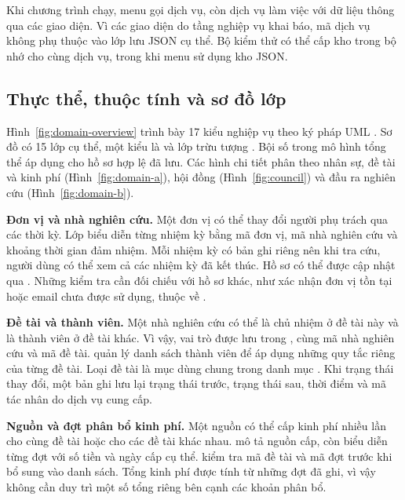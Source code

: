 Khi chương trình chạy, menu gọi dịch vụ, còn dịch vụ làm việc với dữ liệu thông qua các giao diện. Vì các giao diện do tầng nghiệp vụ khai báo, mã dịch vụ không phụ thuộc vào lớp lưu JSON cụ thể. Bộ kiểm thử có thể cấp kho trong bộ nhớ cho cùng dịch vụ, trong khi menu sử dụng kho JSON.

\subsection{Thực thể, thuộc tính và sơ đồ lớp}\label{sec:entities}

Hình~\ref{fig:domain-overview} trình bày 17 kiểu nghiệp vụ theo ký pháp UML . Sơ đồ có 15 lớp cụ thể, một kiểu  là  và lớp trừu tượng . Bội số trong mô hình tổng thể áp dụng cho hồ sơ hợp lệ đã lưu. Các hình chi tiết phân theo nhân sự, đề tài và kinh phí (Hình~\ref{fig:domain-a}), hội đồng (Hình~\ref{fig:council}) và đầu ra nghiên cứu (Hình~\ref{fig:domain-b}).

\textbf{Đơn vị và nhà nghiên cứu.} Một đơn vị có thể thay đổi người phụ trách qua các thời kỳ. Lớp  biểu diễn từng nhiệm kỳ bằng mã đơn vị, mã nhà nghiên cứu và khoảng thời gian đảm nhiệm. Mỗi nhiệm kỳ có bản ghi riêng nên khi tra cứu, người dùng có thể xem cả các nhiệm kỳ đã kết thúc. Hồ sơ  có thể được cập nhật qua . Những kiểm tra cần đối chiếu với hồ sơ khác, như xác nhận đơn vị tồn tại hoặc email chưa được sử dụng, thuộc về .

\textbf{Đề tài và thành viên.} Một nhà nghiên cứu có thể là chủ nhiệm ở đề tài này và là thành viên ở đề tài khác. Vì vậy, vai trò được lưu trong , cùng mã nhà nghiên cứu và mã đề tài.  quản lý danh sách thành viên để áp dụng những quy tắc riêng của từng đề tài. Loại đề tài là mục dùng chung trong danh mục . Khi trạng thái thay đổi, một bản ghi  lưu lại trạng thái trước, trạng thái sau, thời điểm và mã tác nhân do dịch vụ cung cấp.

\textbf{Nguồn và đợt phân bổ kinh phí.} Một nguồn có thể cấp kinh phí nhiều lần cho cùng đề tài hoặc cho các đề tài khác nhau.  mô tả nguồn cấp, còn  biểu diễn từng đợt với số tiền và ngày cấp cụ thể.  kiểm tra mã đề tài và mã đợt trước khi bổ sung vào danh sách. Tổng kinh phí được tính từ những đợt đã ghi, vì vậy không cần duy trì một số tổng riêng bên cạnh các khoản phân bổ.

